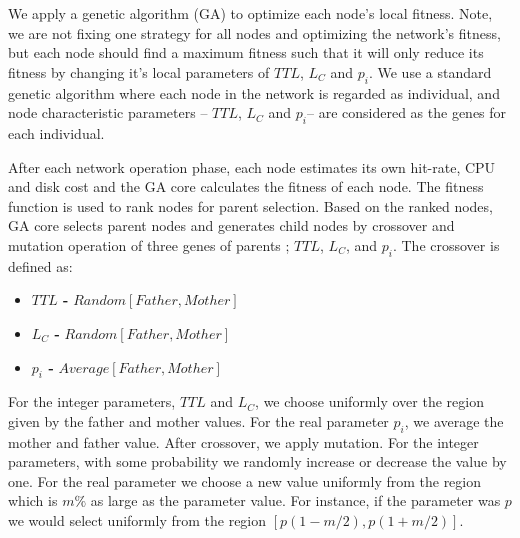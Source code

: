 \documentclass[12pt,journal,draftcls,letterpaper,onecolumn]{IEEEtran}
\begin{document}
We apply a genetic algorithm (GA) to optimize each node's local fitness.  Note, we
are not fixing one strategy for all nodes and optimizing the network's
fitness, but each node should find a maximum fitness such that it will only
reduce its fitness by changing it's local parameters of $TTL$, $L_C$
and $p_i$.
We use a standard genetic algorithm where
each node in the network is regarded as individual, and 
node characteristic parameters -- $TTL$, $L_C$ and $p_i$-- are
considered as the genes for each individual.

After each network operation phase, each node estimates its own hit-rate, CPU and disk cost and
the GA core calculates the fitness of each node. The fitness function is used to
rank nodes for parent selection. Based on the ranked nodes, GA core selects parent nodes and
generates child nodes by crossover and mutation operation of three genes of parents ;
$TTL$, $L_C$, and $p_i$. The crossover is defined as:

\begin{itemize}
\item{\bf $TTL$ -}
$Random[Father, Mother]$
\item{\bf $L_C$ -}
$Random[Father, Mother]$
\item{\bf $p_i$ -}
$Average[Father, Mother]$
\end{itemize}
For the integer parameters, $TTL$ and $L_C$, we choose uniformly 
over the region given by the father and mother values.
For the real parameter $p_i$, we average the mother
and father value.  After crossover, we apply mutation.  For the integer
parameters, with some probability we randomly increase or decrease the value
by one.  For the real parameter we choose a new value uniformly from the
region which is $m\%$ as large as the parameter value.  For instance, if the
parameter was $p$ we would select uniformly from the region $[p(1-m/2),
p(1+m/2)]$.
\end{document}
